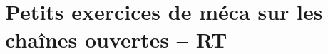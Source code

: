 \documentclass[10pt,fleqn]{article}
\newcommand{\repRel}{../..}
\newcommand{\repStyle}{\repRel/Style}
\newcommand{\td}{fichier_td}
\newcommand{\repExos}{\repRel/ExercicesCompetences}
\newcommand{\repExo}{dossier}
\begin{document}
\def\xxcompetences{}
\def\xxfigures{}
\graphicspath{{\repStyle/png/}}
\setlength{\columnseprule}{.1pt}

\def\xxpartie{}
\def\xxnumpartie{}
\def\xxchapitre{}
\def\xxnumchapitre{}
\def\xxactivite{DDV}
\def\xxtitreexo{Les ptits devoirs de vacances}
\def\xxsourceexo{Xavier Pessoles}

\pagestyle{fancy}
\thispagestyle{plain}
\vspace{4.5cm}
\proffalse


\section{Petits exercices de méca sur les chaînes ouvertes -- RT} 

\begin{multicols}{2} 
\renewcommand{\repExo}{\repExos/B2_ProposerModele/B2_12_ModeliserSchemasCinematiques/05_RT}
\renewcommand{\td}{05_RT}
\graphicspath{{\repStyle/png/}{\repExo/images/}}



\end{multicols}
\end{document}
